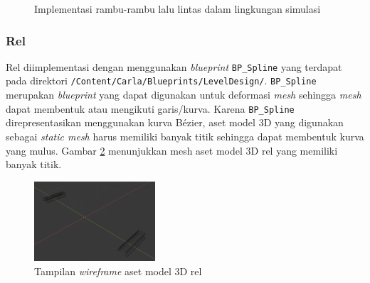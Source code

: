 \begin{figure}[!h]
    \centering
    \hfill
    \caption{Implementasi rambu-rambu lalu lintas dalam lingkungan simulasi}
    \label{fig:road-signs}
\end{figure}

\subsubsection{Rel}

Rel diimplementasi dengan menggunakan \textit{blueprint} \verb|BP_Spline| yang
terdapat pada direktori \verb|/Content/Carla/Blueprints/LevelDesign/|.
\verb|BP_Spline| merupakan \textit{blueprint} yang dapat digunakan untuk
deformasi \textit{mesh} sehingga \textit{mesh} dapat membentuk atau mengikuti
garis/kurva. Karena \verb|BP_Spline| direpresentasikan menggunakan kurva Bézier,
aset model 3D yang digunakan sebagai \textit{static mesh} harus memiliki banyak
titik sehingga dapat membentuk kurva yang mulus. Gambar \ref{fig:rel-mesh}
menunjukkan mesh aset model 3D rel yang memiliki banyak titik.

\begin{figure}[!h]
    \centering
    \includegraphics[width=0.4\textwidth]{resources/chapter-4/rel-mesh.png}
    \caption{Tampilan \textit{wireframe} aset model 3D rel}
    \label{fig:rel-mesh}
\end{figure}

